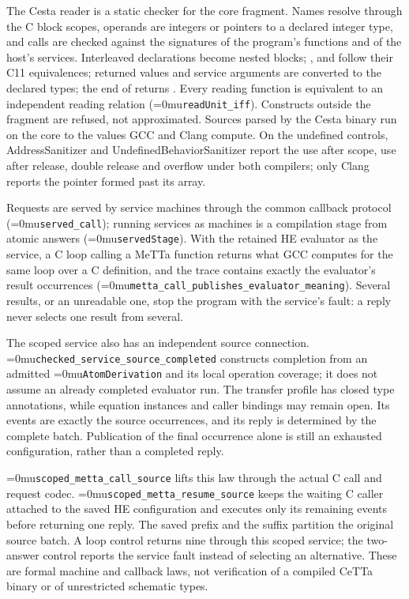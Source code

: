 \documentclass[11pt,a4paper]{article}
\newcommand{\code}[1]{\texttt{\detokenize{#1}}}
\newcommand{\name}[1]{\textup{\Urlmuskip=0mu\relax\nolinkurl{#1}}}
\begin{document}
The Cesta reader is a static checker for the core fragment. Names resolve through
the C block scopes, operands are integers or pointers to a declared integer type,
and calls are checked against the signatures of the program's functions and of the
host's services. Interleaved declarations become nested blocks; \code{E1[E2]},
\code{&*E} and \code{&E1[E2]} follow their C11 equivalences; returned values and
service arguments are converted to the declared types; the end of \code{int main}
returns \code{0}. Every reading function is equivalent to an independent reading
relation (\name{readUnit_iff}). Constructs outside the fragment are refused, not
approximated. Sources parsed by the Cesta binary run on the core to the values GCC
and Clang compute. On the undefined controls, AddressSanitizer and
UndefinedBehaviorSanitizer report the use after scope, use after release, double
release and overflow under both compilers; only Clang reports the pointer formed
past its array.

Requests are served by service machines through the common callback protocol
(\name{served_call}); running services as machines is a compilation stage from
atomic answers (\name{servedStage}). With the retained HE evaluator as the service,
a C loop calling a MeTTa function returns what GCC computes for the same loop over a
C definition, and the trace contains exactly the evaluator's result occurrences
(\name{metta_call_publishes_evaluator_meaning}). Several results, or an unreadable
one, stop the program with the service's fault: a reply never selects one result
from several.

The scoped service also has an independent source connection.
\name{checked_service_source_completed} constructs completion from an
admitted \name{AtomDerivation} and its local operation coverage; it does not
assume an already completed evaluator run. The transfer profile has closed
type annotations, while equation instances and caller bindings may remain
open. Its events are exactly the source occurrences, and its reply is
determined by the complete batch. Publication of the final occurrence alone
is still an exhausted configuration, rather than a completed reply.

\name{scoped_metta_call_source} lifts this law through the actual C call and
request codec. \name{scoped_metta_resume_source} keeps the waiting C caller
attached to the saved HE configuration and executes only its remaining
events before returning one reply. The saved prefix and the suffix partition
the original source batch. A loop control returns nine through this scoped
service; the two-answer control reports the service fault instead of
selecting an alternative. These are formal machine and callback laws, not
verification of a compiled CeTTa binary or of unrestricted schematic types.
\end{document}
